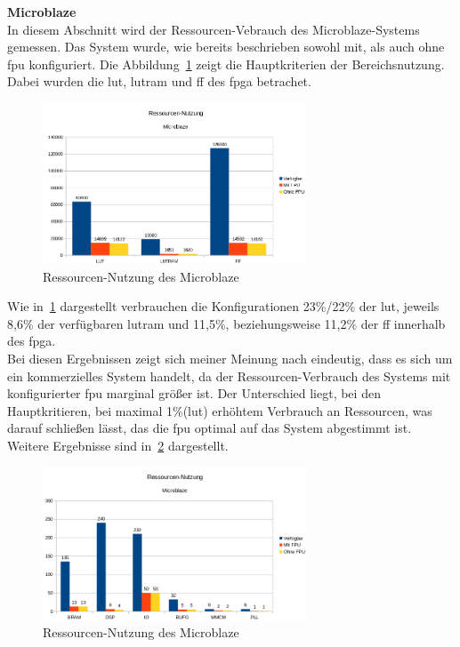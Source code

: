 \textbf{Microblaze}\\

In diesem Abschnitt wird der Ressourcen-Vebrauch des Microblaze-Systems gemessen. Das System wurde, wie bereits beschrieben sowohl mit, als auch ohne \ac{fpu} konfiguriert.
Die Abbildung~\ref{fig:ressourcenmb1} zeigt die Hauptkriterien der Bereichsnutzung. Dabei wurden die \ac{lut}, \ac{lutram} und \ac{ff} des \ac{fpga} betrachet.\\

\begin{figure}[H]
\centering
\includegraphics[width=0.7\textwidth]{Hauptteil/ressourcenmb1.png}
\caption{Ressourcen-Nutzung des Microblaze}
\label{fig:ressourcenmb1}
\end{figure}

Wie in~\ref{fig:ressourcenmb1} dargestellt verbrauchen die Konfigurationen 23\%/22\% der \ac{lut}, jeweils 8,6\% der verfügbaren \ac{lutram} und 11,5\%, beziehungsweise 11,2\% der \ac{ff}
innerhalb des \ac{fpga}.\\
Bei diesen Ergebnissen zeigt sich meiner Meinung nach eindeutig, dass es sich um ein kommerzielles System handelt, da der Ressourcen-Verbrauch des Systems mit konfigurierter \ac{fpu}
marginal größer ist. Der Unterschied liegt, bei den Hauptkritieren, bei maximal 1\%(\ac{lut}) erhöhtem Verbrauch an Ressourcen, was darauf schließen lässt, das die \ac{fpu} optimal auf das System
abgestimmt ist.\\

Weitere Ergebnisse sind in~\ref{fig:ressourcenmb2} dargestellt.\\

\begin{figure}[H]
\centering
\includegraphics[width=0.7\textwidth]{Hauptteil/ressourcenmb2.png}
\caption{Ressourcen-Nutzung des Microblaze}
\label{fig:ressourcenmb2}
\end{figure}

